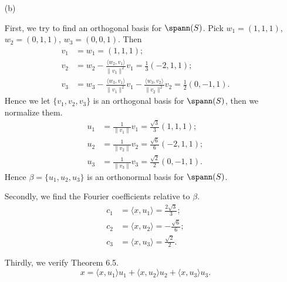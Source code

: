 \begin{Exercise}
	\begin{enumerate}[(a)]
		\item[(b)]
		\begin{solution}
			First, we try to find an orthogonal basis for $\spann(S)$. Pick $w_1 = (1,1,1)$, $w_2 = (0,1,1)$, $w_3 = (0,0,1)$. Then 
			\begin{align*}
			v_1 &= w_1 = (1,1,1); \\
			v_2 &= w_2 - \frac{\langle w_2, v_1 \rangle}{\|v_1\|^2}v_1
			= \frac{1}{3}(-2,1,1); \\
			v_3 &= w_3 - \frac{\langle w_3,v_1 \rangle}{\|v_1\|^2}v_1 - \frac{\langle w_3, v_2 \rangle}{\|v_2\|^2}v_2
			= \frac{1}{2}(0,-1,1).
			\end{align*}
			Hence we let $\{v_1, v_2, v_3\}$ is an orthogonal basis for $\spann(S)$, then we normalize them.
			\begin{align*}
			u_1 &= \frac{1}{\|v_1\|}v_1 = \frac{\sqrt{3}}{3}(1,1,1); \\
			u_2 &= \frac{1}{\|v_2\|}v_2 = \frac{\sqrt{6}}{6}(-2,1,1); \\
			u_3 &= \frac{1}{\|v_3\|}v_3 = \frac{\sqrt{2}}{2}(0,-1,1).
			\end{align*}
			Hence $\beta = \{u_1,u_2,u_3\}$ is an orthonormal basis for $\spann(S)$.
			
			Secondly, we find the Fourier coefficients relative to $\beta$.
			\begin{align*}
			c_1 &= \langle x, u_1 \rangle = \frac{2\sqrt{3}}{3}; \\
			c_2 &= \langle x, u_2 \rangle = -\frac{\sqrt{6}}{6}; \\
			c_3 &= \langle x, u_3 \rangle = \frac{\sqrt{2}}{2}.
			\end{align*}
			
			Thirdly, we verify Theorem 6.5.
			$$
			x = \langle x, u_1 \rangle u_1 + \langle x,u_2 \rangle u_2 + \langle x, u_3 \rangle u_3.
			$$
		\end{solution}
	\end{enumerate}
\end{Exercise}